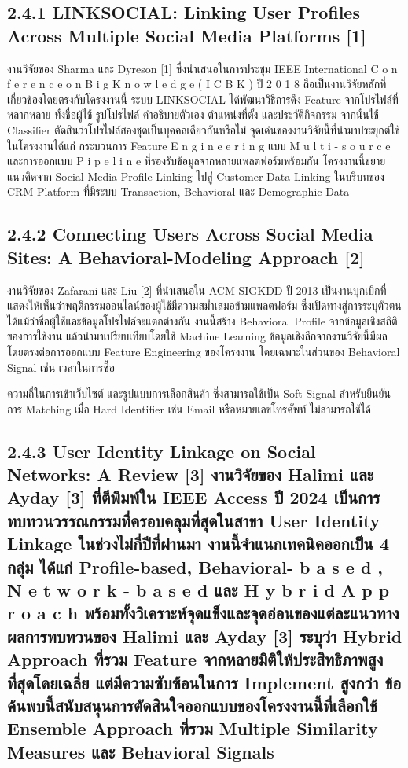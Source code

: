 \documentclass[12pt,a4paper]{report}
\begin{document}
\subsection*{2.4.1 LINKSOCIAL: Linking User Profiles Across Multiple Social Media Platforms [1]}
งานวิจัยของ Sharma และ Dyreson [1] ซึ่งนำเสนอในการประชุม IEEE International C o n f e r e n c e o n B i g K n o w l e d g e ( I C B K ) ปี 2 0 1 8 ถือเป็นงานวิจัยหลักที่เกี่ยวข้องโดยตรงกับโครงงานนี้ ระบบ LINKSOCIAL ได้พัฒนาวิธีการดึง Feature จากโปรไฟล์ที่หลากหลาย ทั้งชื่อผู้ใช้ รูปโปรไฟล์ คำอธิบายตัวเอง ตำแหน่งที่ตั้ง และประวัติกิจกรรม จากนั้นใช้ Classifier ตัดสินว่าโปรไฟล์สองชุดเป็นบุคคลเดียวกันหรือไม่ จุดเด่นของงานวิจัยนี้ที่นำมาประยุกต์ใช้ในโครงงานได้แก่ กระบวนการ Feature E n g i n e e r i n g แบบ M u l t i - s o u r c e และการออกแบบ P i p e l i n e ที่รองรับข้อมูลจากหลายแพลตฟอร์มพร้อมกัน โครงงานนี้ขยายแนวคิดจาก Social Media Profile Linking ไปสู่ Customer Data Linking ในบริบทของ CRM Platform ที่มีระบบ Transaction, Behavioral และ Demographic Data\par
\subsection*{2.4.2 Connecting Users Across Social Media Sites: A Behavioral-Modeling Approach [2]}
งานวิจัยของ Zafarani และ Liu [2] ที่นำเสนอใน ACM SIGKDD ปี 2013 เป็นงานบุกเบิกที่แสดงให้เห็นว่าพฤติกรรมออนไลน์ของผู้ใช้มีความสม่ำเสมอข้ามแพลตฟอร์ม ซึ่งเปิดทางสู่การระบุตัวตนได้แม้ว่าชื่อผู้ใช้และข้อมูลโปรไฟล์จะแตกต่างกัน งานนี้สร้าง Behavioral Profile จากข้อมูลเชิงสถิติของการใช้งาน แล้วนำมาเปรียบเทียบโดยใช้ Machine Learning ข้อมูลเชิงลึกจากงานวิจัยนี้มีผลโดยตรงต่อการออกแบบ Feature Engineering ของโครงงาน โดยเฉพาะในส่วนของ Behavioral Signal เช่น เวลาในการซื้อ\par
\clearpage
ความถี่ในการเข้าเว็บไซต์ และรูปแบบการเลือกสินค้า ซึ่งสามารถใช้เป็น Soft Signal สำหรับยืนยันการ Matching เมื่อ Hard Identifier เช่น Email หรือหมายเลขโทรศัพท์ ไม่สามารถใช้ได้\par
\subsection*{2.4.3 User Identity Linkage on Social Networks: A Review [3] งานวิจัยของ Halimi และ Ayday [3] ที่ตีพิมพ์ใน IEEE Access ปี 2024 เป็นการทบทวนวรรณกรรมที่ครอบคลุมที่สุดในสาขา User Identity Linkage ในช่วงไม่กี่ปีที่ผ่านมา งานนี้จำแนกเทคนิคออกเป็น 4 กลุ่ม ได้แก่ Profile-based, Behavioral- b a s e d , N e t w o r k - b a s e d และ H y b r i d A p p r o a c h พร้อมทั้งวิเคราะห์จุดแข็งและจุดอ่อนของแต่ละแนวทาง ผลการทบทวนของ Halimi และ Ayday [3] ระบุว่า Hybrid Approach ที่รวม Feature จากหลายมิติให้ประสิทธิภาพสูงที่สุดโดยเฉลี่ย แต่มีความซับซ้อนในการ Implement สูงกว่า ข้อค้นพบนี้สนับสนุนการตัดสินใจออกแบบของโครงงานนี้ที่เลือกใช้ Ensemble Approach ที่รวม Multiple Similarity Measures และ Behavioral Signals}
\end{document}
